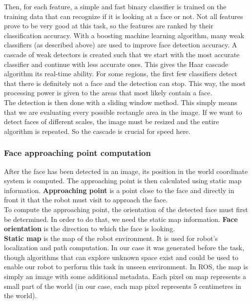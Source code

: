 \documentclass[12pt,a4paper]{article}
\begin{document}
	Then, for each feature, a simple and fast binary classifier is trained on the training data that can recognize if it is looking at a face or not. Not all features prove to be very good at this task, so the features are ranked by their classification accuracy. With a boosting machine learning algorithm, many weak classifiers (as described above) are used to improve face detection accuracy. A cascade of weak detectors is created such that we start with the most accurate classifier and continue with less accurate ones. This gives the Haar cascade algorithm its real-time ability. For some regions, the first few classifiers detect that there is definitely not a face and the detection can stop. This way, the most processing power is given to the areas that most likely contain a face. \\
	
	The detection is then done with a sliding window method. This simply means that we are evaluating every possible rectangle area in the image. If we want to detect faces of different scales, the image must be resized and the entire algorithm is repeated. So the cascade is crucial for speed here. \\
	
	\subsubsection{Face approaching point computation} \label{face_approaching_points}
	After the face has been detected in an image, its position in the world coordinate system is computed. The approaching point is then calculated using static map information. \textbf{Approaching point} is a point close to the face and directly in front it that the robot must visit to approach the face. \\
	
	To compute the approaching point, the orientation of the detected face must first be determined. In order to do that, we need the static map information. \textbf{Face orientation} is the direction to which the face is looking. \\
	
	\textbf{Static map} is the map of the robot environment. It is used for robot's localization and path computation. In our case it was generated before the task, though algorithms that can explore unknown space exist and could be used to enable our robot to perform this task in unseen environment. In ROS, the map is simply an image with some additional metadata. Each pixel on map represents a small part of the world (in our case, each map pixel represents 5 centimetres in the world).\\
	
\end{document}
